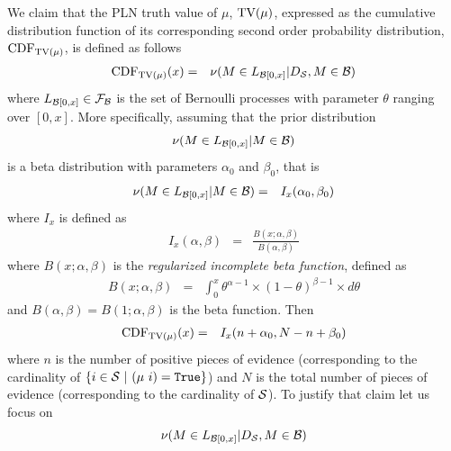 \documentclass[]{article}
\begin{document}
We claim that the PLN truth value of $\mu$, $\text{TV}(\mu)$, expressed as
the cumulative distribution function of its corresponding second order
probability distribution, $\text{CDF}_{\text{TV}(\mu)}$, is defined as follows
\begin{eqnarray}
  \text{CDF}_{\text{TV}(\mu)}(x)
  & = &
  \nu(M \in L_{\mathcal{B}[0,x]} | D_{\mathcal{S}}, M \in \mathcal{B})
\end{eqnarray}
where $L_{\mathcal{B}[0,x]} \in \mathcal{F}_{\mathcal{B}}$ is the set of
Bernoulli processes with parameter $\theta$ ranging over $[0, x]$.
More specifically, assuming that the prior distribution
$$\nu(M \in L_{\mathcal{B}[0,x]} | M \in \mathcal{B})$$
is a beta distribution with parameters $\alpha_0$ and $\beta_0$, that
is
\begin{eqnarray}
  \nu(M \in L_{\mathcal{B}[0,x]} | M \in \mathcal{B})
  & = &
  I_x(\alpha_0, \beta_0)
  \label{eq:betaprior}
\end{eqnarray}
where $I_x$ is defined as
\begin{eqnarray}
  I_x(\alpha, \beta) & = & \frac{B(x; \alpha, \beta)}{B(\alpha, \beta)}
\end{eqnarray}
where $B(x; \alpha, \beta)$ is the \emph{regularized incomplete beta
function}, defined as
\begin{eqnarray}
  B(x; \alpha, \beta)
  & = &
  \displaystyle
  \int_0^x \theta^{\alpha-1}\times (1-\theta)^{\beta-1} \times d\theta
  \label{eq:regibeta}
\end{eqnarray}
and $B(\alpha, \beta) = B(1; \alpha, \beta)$ is the beta function.
Then
\begin{eqnarray}
  \text{CDF}_{\text{TV}(\mu)}(x)
  & = & I_x(n+\alpha_0, N - n + \beta_0)\label{eq:tvmui}
\end{eqnarray}
where $n$ is the number of positive pieces of evidence (corresponding
to the cardinality of $\{i\in \mathcal{S}\ |\ (\mu\ i) = \texttt{True}\}$) and $N$
is the total number of pieces of evidence (corresponding to the
cardinality of $\mathcal{S}$).  To justify that claim let us focus on
$$\nu(M \in L_{\mathcal{B}[0,x]} | D_{\mathcal{S}}, M \in \mathcal{B})$$
\end{document}
